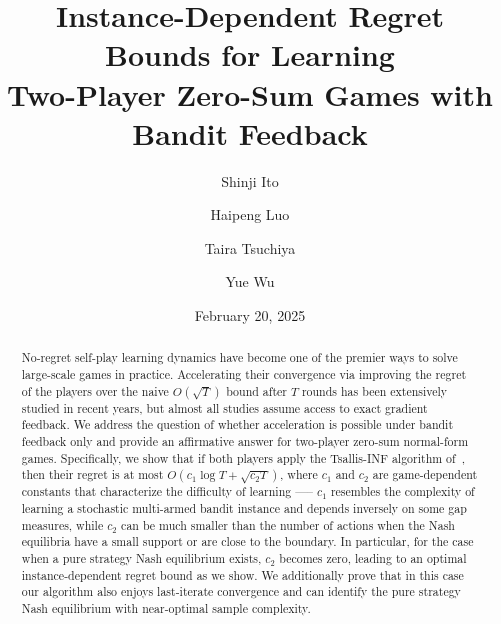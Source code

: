 \documentclass[11pt,a4paper]{article}
\title{Instance-Dependent Regret Bounds for Learning \\ Two-Player Zero-Sum Games with Bandit Feedback}
\date{February 20, 2025}
\author[1,2]{Shinji Ito}
\author[3]{Haipeng Luo}
\author[1,2]{Taira Tsuchiya}
\author[3]{Yue Wu}
\affil[1]{The University of Tokyo\\ \texttt{\{shinji,tsuchiya\}@mist.i.u-tokyo.ac.jp}}
\affil[2]{RIKEN AIP}
\affil[3]{University of Southern California\\ \texttt{\{haipengl, wu.yue\}@usc.edu}}
\begin{document}
\maketitle
{}


\begin{abstract}%
No-regret self-play learning dynamics have become one of the premier ways to solve large-scale games in practice.
Accelerating their convergence via improving the regret of the players over the naive $O(\sqrt{T})$ bound after $T$ rounds has been extensively studied in recent years, but almost all studies assume access to exact gradient feedback.
We address the question of whether acceleration is possible under bandit feedback only and provide an affirmative answer for two-player zero-sum normal-form games.
Specifically, we show that if both players apply the Tsallis-INF algorithm of~\citet{zimmert2021tsallis}, then their regret is at most $O(c_1 \log T +  \sqrt{c_2 T})$, where $c_1$ and $c_2$ are game-dependent constants that characterize the difficulty of learning ----- $c_1$ resembles the complexity of learning a stochastic multi-armed bandit instance and depends inversely on some gap measures,
while $c_2$ can be much smaller than the number of actions when the Nash equilibria have a small support or are close to the boundary. 
In particular, for the case when a pure strategy Nash equilibrium exists, $c_2$ becomes zero, leading to an optimal instance-dependent regret bound as we show.
We additionally prove that in this case our algorithm also enjoys last-iterate convergence and can identify the pure strategy Nash equilibrium with near-optimal sample complexity.
\end{abstract}






















\end{document}

